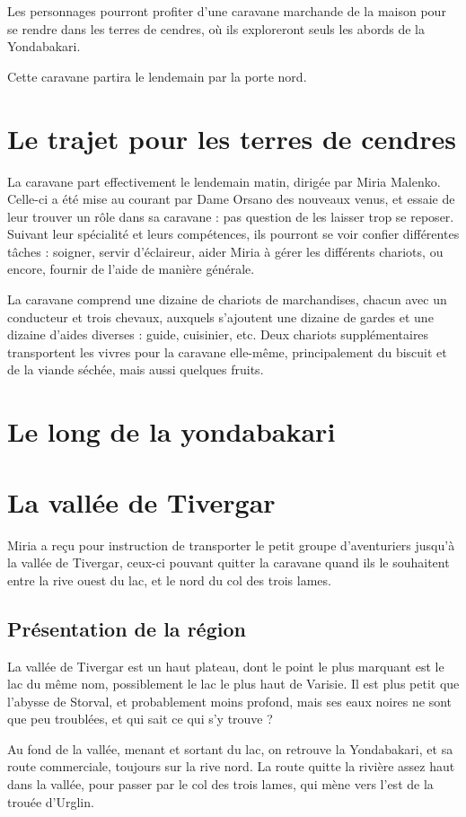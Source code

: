 \documentclass[letterpaper,10pt,twoside,twocolumn,openany]{book}
\begin{document}
Les personnages pourront profiter d'une caravane marchande de la maison pour se rendre dans les terres de cendres, où ils exploreront seuls les abords de la Yondabakari.

Cette caravane partira le lendemain par la porte nord.
\section{Le trajet pour les terres de cendres}
La caravane part effectivement le lendemain matin, dirigée par Miria Malenko. Celle-ci a été mise au courant par Dame Orsano des nouveaux venus, et essaie de leur trouver un rôle dans sa caravane : pas question de les laisser trop se reposer. Suivant leur spécialité et leurs compétences, ils pourront se voir confier différentes tâches : soigner, servir d'éclaireur, aider Miria à gérer les différents chariots, ou encore, fournir de l'aide de manière générale.

La caravane comprend une dizaine de chariots de marchandises, chacun avec un conducteur et trois chevaux, auxquels s'ajoutent une dizaine de gardes et une dizaine d'aides diverses : guide, cuisinier, etc. Deux chariots supplémentaires transportent les vivres pour la caravane elle-même, principalement du biscuit et de la viande séchée, mais aussi quelques fruits.


\section{Le long de la yondabakari}
\section{La vallée de Tivergar}
Miria a reçu pour instruction de transporter le petit groupe d'aventuriers jusqu'à la vallée de Tivergar, ceux-ci pouvant quitter la caravane quand ils le souhaitent entre la rive ouest du lac, et le nord du col des trois lames.
\subsection{Présentation de la région}
La vallée de Tivergar est un haut plateau, dont le point le plus marquant est le lac du même nom, possiblement le lac le plus haut de Varisie. Il est plus petit que l'abysse de Storval, et probablement moins profond, mais ses eaux noires ne sont que peu troublées, et qui sait ce qui s'y trouve ?

Au fond de la vallée, menant et sortant du lac, on retrouve la Yondabakari, et sa route commerciale, toujours sur la rive nord. La route quitte la rivière assez haut dans la vallée, pour passer par le col des trois lames, qui mène vers l'est de la trouée d'Urglin.
\end{document}
